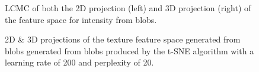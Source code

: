 \begin{figure}[H]
	\centering
	\caption{LCMC of both the 2D projection (left) and 3D projection (right) of the feature space for intensity from blobs.}\label{fig:LCMC_intensity}
\end{figure}
\clearpage

\clearpage
\begin{figure}[H]
	\centering
	\caption{2D \& 3D projections of the texture feature space generated from blobs generated from blobs produced by the t-SNE algorithm with a learning rate of 200 and perplexity of 20.}\label{fig:texture_SNE_mapping}
\end{figure}

